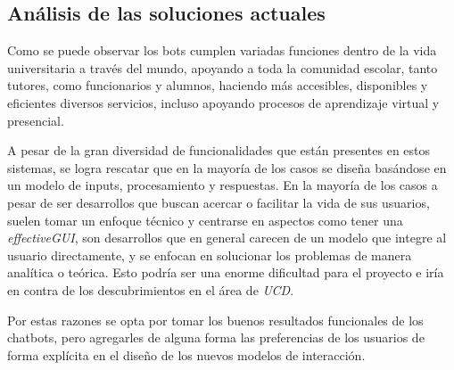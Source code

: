     \subsection{Análisis de las soluciones actuales}
    \par Como se puede observar los bots cumplen variadas funciones dentro de la vida universitaria a través del mundo, apoyando a toda la comunidad escolar, tanto tutores, como funcionarios y alumnos, haciendo más accesibles, disponibles y eficientes diversos servicios, incluso apoyando procesos de aprendizaje virtual y presencial.
    \par A pesar de la gran diversidad de funcionalidades que están presentes en estos sistemas, se logra rescatar que en la mayoría de los casos se diseña basándose en un modelo de inputs, procesamiento y respuestas. En la mayoría de los casos a pesar de ser desarrollos que buscan acercar o facilitar la vida de sus usuarios, suelen tomar un enfoque técnico y centrarse en aspectos como tener una \textit{\acrshort{effectiveGUI}}, son desarrollos que en general carecen de un modelo que integre al usuario directamente, y se enfocan en solucionar los problemas de manera analítica o teórica. Esto podría ser una enorme dificultad para el proyecto e iría en contra de los descubrimientos en el área de \textit{\acrlong{UCD}}.
    \par Por estas razones se opta por tomar los buenos resultados funcionales de los chatbots, pero agregarles de alguna forma las preferencias de los usuarios de forma explícita en el diseño de los nuevos modelos de interacción.
